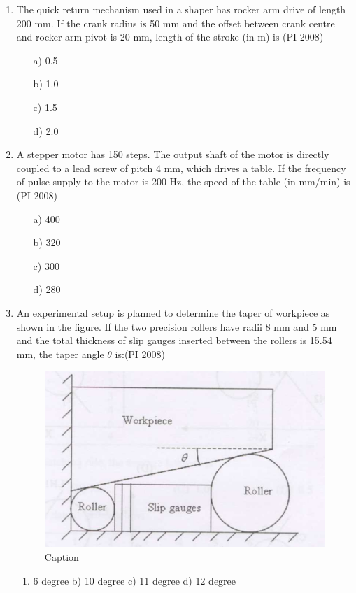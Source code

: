 \documentclass[journal,12pt,onecolumn]{IEEEtran}
\theoremstyle{remark}
\begin{document}
\begin{enumerate}
\item %
The quick return mechanism used in a shaper has rocker arm drive of length 200 mm. If the crank radius is 50 mm and the offset between crank centre and rocker arm pivot is 20 mm, length of the stroke (in m) is  \hfill{(PI 2008)}
\begin{multicols}{4}
    \begin{enumerate}
\item[a)] 0.5
\item[b)] 1.0
\item[c)] 1.5
\item[d)] 2.0
\end{enumerate}
\end{multicols}
\vspace{1cm}
\item %
A stepper motor has 150 steps. The output shaft of the motor is directly coupled to a lead screw of pitch 4 mm, which drives a table. If the frequency of pulse supply to the motor is 200 Hz, the speed of the table (in mm/min) is  \hfill{(PI 2008)}
\begin{multicols}{4}
    \begin{enumerate}
\item[a)] 400
\item[b)] 320
\item[c)] 300
\item[d)] 280
\end{enumerate}
\end{multicols}
\vspace{1cm}


\item %
An experimental setup is planned to determine the taper of workpiece as shown in the figure. If the two precision rollers have radii 8 mm and 5 mm and the total thickness of slip gauges inserted between the rollers is 15.54 mm, the taper angle $\theta$ is:\hfill{(PI 2008)}

\begin{figure}
    \centering
    \includegraphics[width=0.5\linewidth]{figures/GATE-pi-2008-60.png}
    \caption{Caption}
    \label{q60}
\end{figure}
\begin{multicols}{4}
    \begin{enumerate}
\item 6 degree 
b) 10 degree 
c) 11 degree
d) 12 degree


\end{enumerate}
\end{multicols}
\end{enumerate}
\end{document}
